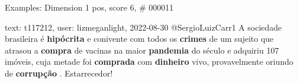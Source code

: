 \begin{frame}{Examples: Dimension 1 pos, score 6, \# 000011}
\footnotesize
\begin{exampleblock}{text: t117212, user: lizmeganlight, 2022-08-30}
@SergioLuizCarr1 A sociedade brasileira é \textbf{hipócrita} e conivente com 
todos os \textbf{crimes} de um sujeito que atrasou a \textbf{compra} de vacinas 
na maior \textbf{pandemia} do século e adquiriu 107 imóveis, cuja metade foi 
\textbf{comprada} com \textbf{dinheiro} vivo, provavelmente oriundo de 
\textbf{corrupção} . Estarrecedor! 
\end{exampleblock}
\end{frame}
